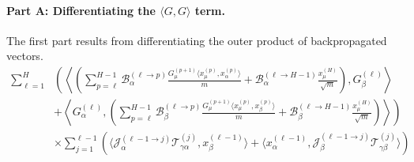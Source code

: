 \documentclass[11pt,a4paper]{article}
\theoremstyle{definition}
\begin{document}
\paragraph{Part A: Differentiating the $\langle G,G \rangle$ term.}
The first part results from differentiating the outer product of backpropagated vectors.
\begin{align}
\sum_{\ell=1}^{H} & \left( \left\langle \left(\sum_{p=\ell}^{H-1} \mathcal{B}^{(\ell \to p)}_{\alpha} \frac{G^{(p+1)}_\mu \langle x^{(p)}_\mu, x^{(p)}_\alpha \rangle}{m} + \mathcal{B}^{(\ell \to H-1)}_{\alpha} \frac{x^{(H)}_\mu}{\sqrt{m}}\right), G^{(\ell)}_\beta \right\rangle \right. \nonumber \\
& \left. + \left\langle G^{(\ell)}_\alpha, \left(\sum_{p=\ell}^{H-1} \mathcal{B}^{(\ell \to p)}_{\beta} \frac{G^{(p+1)}_\mu \langle x^{(p)}_\mu, x^{(p)}_\beta \rangle}{m} + \mathcal{B}^{(\ell \to H-1)}_{\beta} \frac{x^{(H)}_\mu}{\sqrt{m}}\right) \right\rangle \right) \nonumber \\
& \times \sum_{j=1}^{\ell-1} \left( \langle \mathcal{J}^{(\ell-1 \to j)}_{\alpha} \mathcal{T}^{(j)}_{\gamma\alpha}, x^{(\ell-1)}_\beta \rangle + \langle x^{(\ell-1)}_\alpha, \mathcal{J}^{(\ell-1 \to j)}_{\beta} \mathcal{T}^{(j)}_{\gamma\beta} \rangle \right)
\end{align}
\end{document}
